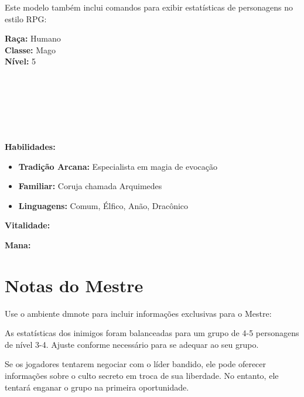 Este modelo também inclui comandos para exibir estatísticas de personagens no estilo RPG:

\begin{character}

\begin{multicols}{2}
\textbf{Raça:} Humano\\
\textbf{Classe:} Mago\\
\textbf{Nível:} 5

\columnbreak

\\
\\
\\
\\
\\
\end{multicols}

\textbf{Habilidades:}
\begin{itemize}
    \item \textbf{Tradição Arcana:} Especialista em magia de evocação
    \item \textbf{Familiar:} Coruja chamada Arquimedes
    \item \textbf{Linguagens:} Comum, Élfico, Anão, Dracônico
\end{itemize}

\textbf{Vitalidade:}\\

\textbf{Mana:}\\
\end{character}

\section{Notas do Mestre}

Use o ambiente dmnote para incluir informações exclusivas para o Mestre:

\begin{dmnote}
As estatísticas dos inimigos foram balanceadas para um grupo de 4-5 personagens de nível 3-4. Ajuste conforme necessário para se adequar ao seu grupo.

Se os jogadores tentarem negociar com o líder bandido, ele pode oferecer informações sobre o culto secreto em troca de sua liberdade. No entanto, ele tentará enganar o grupo na primeira oportunidade.
\end{dmnote}

